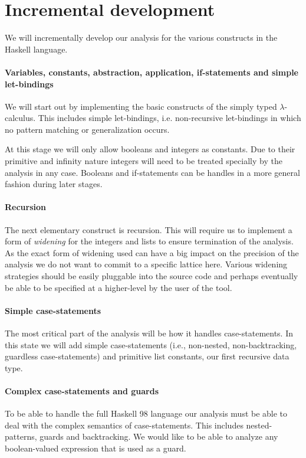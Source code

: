 \documentclass[a4paper]{report}
\begin{document}

\section{Incremental development}
We will incrementally develop our analysis for the various constructs in the Haskell language. 

\paragraph{Variables, constants, abstraction, application, if-statements and simple let-bindings} We will start out by implementing the basic constructs of the simply typed $\lambda$-calculus. This includes simple let-bindings, i.e. non-recursive let-bindings in which no pattern matching or generalization occurs. 

At this stage we will only allow booleans and integers as constants. Due to their primitive and infinity nature integers will need to be treated specially by the analysis in any case. Booleans and if-statements can be handles in a more general fashion during later stages.
\paragraph{Recursion} The next elementary construct is recursion. This will require us to implement a form of \emph{widening} for the integers and lists to ensure termination of the analysis. As the exact form of widening used can have a big impact on the precision of the analysis we do not want to commit to a specific lattice here. Various widening strategies should be easily pluggable into the source code and perhaps eventually be able to be specified at a higher-level by the user of the tool.
\paragraph{Simple case-statements} The most critical part of the analysis will be how it handles case-statements. In this state we will add simple case-statements (i.e., non-nested, non-backtracking, guardless case-statements) and primitive list constants, our first recursive data type.
\paragraph{Complex case-statements and guards} To be able to handle the full Haskell 98 language our analysis must be able to deal with the complex semantics of case-statements. This includes nested-patterns, guards and backtracking. We would like to be able to analyze any boolean-valued expression that is used as a guard.
\end{document}
